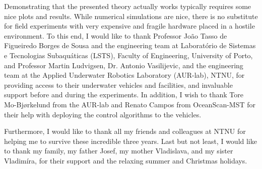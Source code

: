 Demonstrating that the presented theory actually works typically requires some nice plots and results.
While numerical simulations are nice, there is no substitute for field experiments with very expensive and fragile hardware placed in a hostile environment.
To this end, I would like to thank Professor Jo\~{a}o Tasso de Figueiredo Borges de Sousa and the engineering team at Laborat\'{o}rio de Sistemas e Tecnologias Subaqu\'{a}ticas (LSTS), Faculty of Engineering, University of Porto, and Professor Martin Ludvigsen, Dr. Antonio Vasilijevic, and the engineering team at the Applied Underwater Robotics Laboratory (AUR-lab), NTNU, for providing access to their underwater vehicles and facilities, and invaluable support before and during the experiments. 
In addition, I wish to thank Tore Mo-Bjørkelund from the AUR-lab and Renato Campos from OceanScan-MST for their help with deploying the control algorithms to the vehicles.

Furthermore, I would like to thank all my friends and colleagues at NTNU for helping me to survive these incredible three years.
Last but not least, I would like to thank my family, my father Josef, my mother Vladislava, and my sister Vladim\'{i}ra, for their support and the relaxing summer and Christmas holidays.

